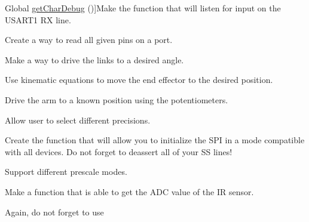 \begin{DoxyRefList}
\hypertarget{todo__todo000030}{}%
Global \hyperlink{_u_s_a_r_t_debug_8c_a6653563b8e7c5134da2d944ff8ef2f73}{get\-Char\-Debug} ()]Make the function that will listen for input on the U\-S\-A\-R\-T1 R\-X line.  
\item[\label{todo__todo000019}%
\hypertarget{todo__todo000019}{}%
Global \hyperlink{ports_8h_a85e9d6d0f75513f3f961c41861299430}{get\-Pins\-Val} (char port, int num\-Pins,...)]Create a way to read all given pins on a port.  
\item[\label{todo__todo000006}%
\hypertarget{todo__todo000006}{}%
Global \hyperlink{motors_8h_af29dc743a43c233ac843475727db132f}{goto\-Angles} (int lower\-Theta, int upper\-Theta)]Make a way to drive the links to a desired angle.  
\item[\label{todo__todo000007}%
\hypertarget{todo__todo000007}{}%
Global \hyperlink{motors_8h_aa294b49bfcc17cf4b490fb020e359851}{goto\-X\-Y} (int x, int y)]Use kinematic equations to move the end effector to the desired position.  
\item[\label{todo__todo000009}%
\hypertarget{todo__todo000009}{}%
Global \hyperlink{motors_8h_a946fb06843f118c8abacd3aef032584c}{home\-Pos} ()]Drive the arm to a known position using the potentiometers.  
\item[\label{todo__todo000001}%
\hypertarget{todo__todo000001}{}%
Global \hyperlink{_a_d_c_8c_a9c2a3351c429e7ad5ed4458495f56852}{init\-A\-D\-C} (int channel, int free, int interrupts)]Allow user to select different precisions.  
\item[\label{todo__todo000023}%
\hypertarget{todo__todo000023}{}%
Global \hyperlink{_s_p_i_8h_a070402cc6c1cae693d10f59f9c483f76}{init\-S\-P\-I} ()]Create the function that will allow you to initialize the S\-P\-I in a mode compatible with all devices. Do not forget to deassert all of your S\-S lines!  
\item[\label{todo__todo000025}%
\hypertarget{todo__todo000025}{}%
Global \hyperlink{timer_8c_a656bb5d0e209ac041910cbdbf43c7dd9}{init\-Timer} (int timer, int mode, unsigned long comp)]Support different prescale modes.  
\item[\label{todo__todo000011}%
\hypertarget{todo__todo000011}{}%
Global \hyperlink{_periph_8h_ae0fb6b592e76f0934db14682e63982df}{I\-R\-Dist} (int chan)]Make a function that is able to get the A\-D\-C value of the I\-R sensor.  
\item[\label{todo__todo000015}%
\hypertarget{todo__todo000015}{}%
Global \hyperlink{_p_i_d_8h_a4d2fc78b5924045bcc0e20fc95e18d97}{pid\-Consts} ]Again, do not forget to use

\end{DoxyRefList}
